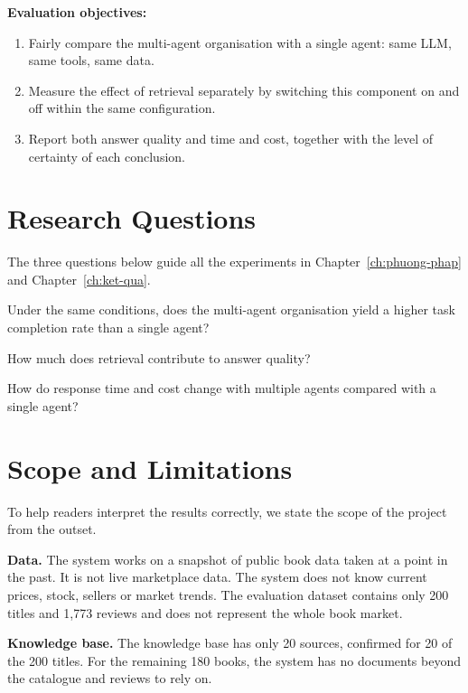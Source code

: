 \textbf{Evaluation objectives:}
\begin{enumerate}
    \item Fairly compare the multi-agent organisation with a single agent: same LLM, same tools, same data.
    \item Measure the effect of retrieval separately by switching this component on and off within the same configuration.
    \item Report both answer quality and time and cost, together with the level of certainty of each conclusion.
\end{enumerate}

\section{Research Questions}

The three questions below guide all the experiments in Chapter~\ref{ch:phuong-phap} and Chapter~\ref{ch:ket-qua}.

\begin{description}[leftmargin=1.2cm,style=nextline]
    \item[Question 1.] Under the same conditions, does the multi-agent organisation yield a higher task completion rate than a single agent?
    \item[Question 2.] How much does retrieval contribute to answer quality?
    \item[Question 3.] How do response time and cost change with multiple agents compared with a single agent?
\end{description}

\section{Scope and Limitations}

To help readers interpret the results correctly, we state the scope of the project from the outset.

\textbf{Data.} The system works on a snapshot of public book data taken at a point in the past. It is not live marketplace data. The system does not know current prices, stock, sellers or market trends. The evaluation dataset contains only 200 titles and 1,773 reviews and does not represent the whole book market.

\textbf{Knowledge base.} The knowledge base has only 20 sources, confirmed for 20 of the 200 titles. For the remaining 180 books, the system has no documents beyond the catalogue and reviews to rely on.

